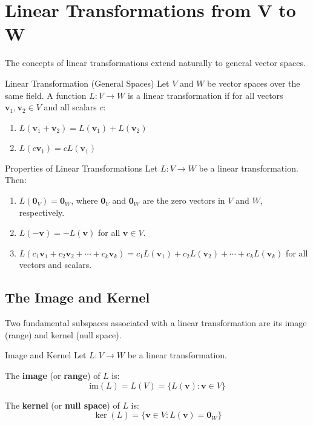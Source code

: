 \documentclass[12pt,a4paper]{article}
\newcommand{\vv}[1]{\mathbf{#1}}
\newcommand{\vzero}{\mathbf{0}}
\newcommand{\im}{\text{im}}
\begin{document}
	\newpage
	
	\section{Linear Transformations from V to W}
	
	The concepts of linear transformations extend naturally to general vector spaces.
	
	\begin{definition}{Linear Transformation (General Spaces)}
		Let $V$ and $W$ be vector spaces over the same field. A function $L: V \to W$ is a linear transformation if for all vectors $\vv{v}_1, \vv{v}_2 \in V$ and all scalars $c$:
		\begin{enumerate}[label=(\roman*)]
			\item $L(\vv{v}_1 + \vv{v}_2) = L(\vv{v}_1) + L(\vv{v}_2)$
			\item $L(c\vv{v}_1) = cL(\vv{v}_1)$
		\end{enumerate}
	\end{definition}
	
	\begin{proposition}{Properties of Linear Transformations}
		Let $L: V \to W$ be a linear transformation. Then:
		\begin{enumerate}[label=(\roman*)]
			\item $L(\vzero_V) = \vzero_W$, where $\vzero_V$ and $\vzero_W$ are the zero vectors in $V$ and $W$, respectively.
			\item $L(-\vv{v}) = -L(\vv{v})$ for all $\vv{v} \in V$.
			\item $L(c_1\vv{v}_1 + c_2\vv{v}_2 + \cdots + c_k\vv{v}_k) = c_1L(\vv{v}_1) + c_2L(\vv{v}_2) + \cdots + c_kL(\vv{v}_k)$ for all vectors and scalars.
		\end{enumerate}
	\end{proposition}
	
	\subsection{The Image and Kernel}
	
	Two fundamental subspaces associated with a linear transformation are its image (range) and kernel (null space).
	
	\begin{definition}{Image and Kernel}
		Let $L: V \to W$ be a linear transformation.
		
		The \textbf{image} (or \textbf{range}) of $L$ is:
		\[
		\im(L) = L(V) = \{L(\vv{v}) : \vv{v} \in V\}
		\]
		
		The \textbf{kernel} (or \textbf{null space}) of $L$ is:
		\[
		\ker(L) = \{\vv{v} \in V : L(\vv{v}) = \vzero_W\}
		\]
	\end{definition}
	
\end{document}
